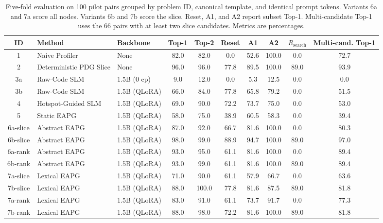\begin{table}[t]
\centering
\small
\caption{Five-fold evaluation on 100 pilot pairs grouped by problem ID, canonical template, and identical prompt tokens. Variants 6a and 7a score all nodes. Variants 6b and 7b score the slice. Reset, A1, and A2 report subset Top-1. Multi-candidate Top-1 uses the 66 pairs with at least two slice candidates. Metrics are percentages.}
\label{tab:ablation_results}
\setlength{\tabcolsep}{4pt}
\begin{tabular}{@{}cllccccccc@{}}
\toprule
\textbf{ID} & \textbf{Method} & \textbf{Backbone} & \textbf{Top-1} & \textbf{Top-2} & \textbf{Reset} & \textbf{A1} & \textbf{A2} & \textbf{$R_{\text{search}}$} & \textbf{Multi-cand. Top-1} \\
\midrule
1 & Naive Profiler & None & 82.0 & 82.0 & 0.0 & 52.6 & 100.0 & 0.0 & 72.7 \\
2 & Deterministic PDG Slice & None & 96.0 & 96.0 & 77.8 & 89.5 & 100.0 & 89.0 & 93.9 \\
\midrule
3a & Raw-Code SLM & 1.5B (0 ep) & 9.0 & 12.0 & 0.0 & 5.3 & 12.5 & 0.0 & 0.0 \\
3b & Raw-Code SLM & 1.5B (QLoRA) & 66.0 & 84.0 & 77.8 & 65.8 & 79.2 & 0.0 & 51.5 \\
4 & Hotspot-Guided SLM & 1.5B (QLoRA) & 69.0 & 90.0 & 72.2 & 73.7 & 75.0 & 0.0 & 53.0 \\
5 & Static EAPG & 1.5B (QLoRA) & 58.0 & 75.0 & 38.9 & 60.5 & 58.3 & 0.0 & 39.4 \\
\midrule
6a-slice & Abstract EAPG & 1.5B (QLoRA) & 87.0 & 92.0 & 66.7 & 81.6 & 100.0 & 0.0 & 80.3 \\
6b-slice & Abstract EAPG & 1.5B (QLoRA) & 98.0 & 99.0 & 88.9 & 94.7 & 100.0 & 89.0 & 97.0 \\
6a-rank & Abstract EAPG & 1.5B (QLoRA) & 93.0 & 95.0 & 61.1 & 81.6 & 100.0 & 0.0 & 89.4 \\
6b-rank & Abstract EAPG & 1.5B (QLoRA) & 93.0 & 99.0 & 61.1 & 81.6 & 100.0 & 89.0 & 89.4 \\
7a-slice & Lexical EAPG & 1.5B (QLoRA) & 71.0 & 90.0 & 61.1 & 57.9 & 66.7 & 0.0 & 63.6 \\
7b-slice & Lexical EAPG & 1.5B (QLoRA) & 88.0 & 100.0 & 77.8 & 81.6 & 87.5 & 89.0 & 81.8 \\
7a-rank & Lexical EAPG & 1.5B (QLoRA) & 83.0 & 91.0 & 61.1 & 73.7 & 91.7 & 0.0 & 77.3 \\
7b-rank & Lexical EAPG & 1.5B (QLoRA) & 88.0 & 98.0 & 72.2 & 81.6 & 100.0 & 89.0 & 81.8 \\
\bottomrule
\end{tabular}
\end{table}